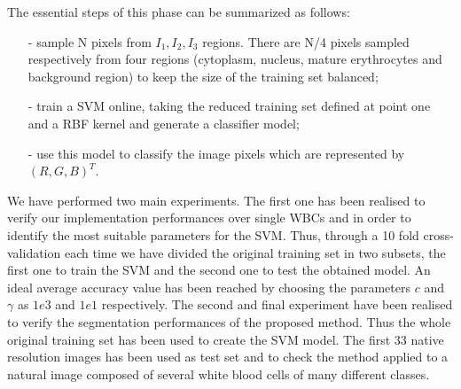 \documentclass[final,a4paper,12pt,english]{UnicaPhdThesis3}
\begin{document}
	The essential steps of this phase can be summarized as follows:
	\begin{itemize}\itemsep3pt \parskip0pt 
		\item[-] sample N pixels from $ I_1, I_2, I_3$ regions. There are N/4 pixels sampled respectively from four regions (cytoplasm, nucleus, mature erythrocytes and background region) to keep the size of the training set balanced;
		\item[-] train a SVM online, taking the reduced training set defined at point one and a RBF kernel and generate a classifier model;
		\item[-] use this model to classify the image pixels which are represented by $(R,G,B)^T.$
	\end{itemize}	
	We have performed two main experiments. The first one has been realised to verify our implementation performances over single WBCs and in order to identify the most suitable parameters for the SVM. Thus, through a 10 fold cross-validation each time we have divided the original training set in two subsets, the first one to train the SVM and the second one to test the obtained model. An ideal average accuracy value has been reached by choosing the parameters $c$ and $\gamma$ as $1e3$ and $1e1$ respectively. 
	The second and final experiment have been realised to verify the segmentation performances of the proposed method. Thus the whole original training set has been used to create the SVM model. The first 33 native resolution images has been used as test set and to check the method applied to a natural image composed of several white blood cells of many different classes. 
	
\end{document}

